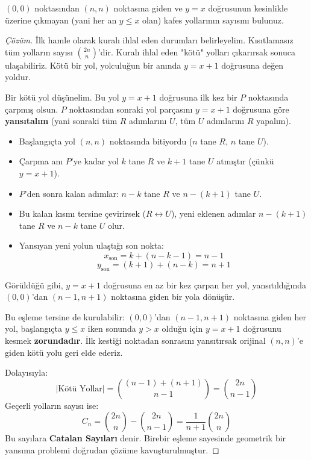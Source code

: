 \begin{example}
$(0,0)$ noktasından $(n,n)$ noktasına giden ve $y = x$ doğrusunun kesinlikle üzerine çıkmayan (yani her an $y \le x$ olan) kafes yollarının sayısını bulunuz.
\end{example}

\begin{proof}[Çözüm]
İlk hamle olarak kuralı ihlal eden durumları belirleyelim. Kısıtlamasız tüm yolların sayısı $\binom{2n}{n}$'dir. Kuralı ihlal eden "kötü" yolları çıkarırsak sonuca ulaşabiliriz. Kötü bir yol, yolculuğun bir anında $y = x+1$ doğrusuna değen yoldur.

Bir kötü yol düşünelim. Bu yol $y = x+1$ doğrusuna ilk kez bir $P$ noktasında çarpmış olsun.
$P$ noktasından sonraki yol parçasını $y = x+1$ doğrusuna göre \textbf{yansıtalım} (yani sonraki tüm $R$ adımlarını $U$, tüm $U$ adımlarını $R$ yapalım).

\begin{itemize}
    \item Başlangıçta yol $(n,n)$ noktasında bitiyordu ($n$ tane $R$, $n$ tane $U$).
    \item Çarpma anı $P$'ye kadar yol $k$ tane $R$ ve $k+1$ tane $U$ atmıştır (çünkü $y = x+1$).
    \item $P$'den sonra kalan adımlar: $n-k$ tane $R$ ve $n - (k+1)$ tane $U$.
    \item Bu kalan kısmı tersine çevirirsek ($R \leftrightarrow U$), yeni eklenen adımlar $n - (k+1)$ tane $R$ ve $n-k$ tane $U$ olur.
    \item Yansıyan yeni yolun ulaştığı son nokta:
    \[ x_{\text{son}} = k + (n - k - 1) = n - 1 \]
    \[ y_{\text{son}} = (k + 1) + (n - k) = n + 1 \]
\end{itemize}
Görüldüğü gibi, $y = x+1$ doğrusuna en az bir kez çarpan her yol, yansıtıldığında $(0,0)$'dan $(n-1, n+1)$ noktasına giden bir yola dönüşür.

Bu eşleme tersine de kurulabilir: $(0,0)$'dan $(n-1, n+1)$ noktasına giden her yol, başlangıçta $y \le x$ iken sonunda $y > x$ olduğu için $y = x+1$ doğrusunu kesmek \textbf{zorundadır}. İlk kestiği noktadan sonrasını yansıtırsak orijinal $(n,n)$'e giden kötü yolu geri elde ederiz.

Dolayısıyla:
\[ |\text{Kötü Yollar}| = \binom{(n-1) + (n+1)}{n-1} = \binom{2n}{n-1} \]
Geçerli yolların sayısı ise:
\[ C_n = \binom{2n}{n} - \binom{2n}{n-1} = \frac{1}{n+1}\binom{2n}{n} \]
Bu sayılara \textbf{Catalan Sayıları} denir. Birebir eşleme sayesinde geometrik bir yansıma problemi doğrudan çözüme kavuşturulmuştur.
\end{proof}

